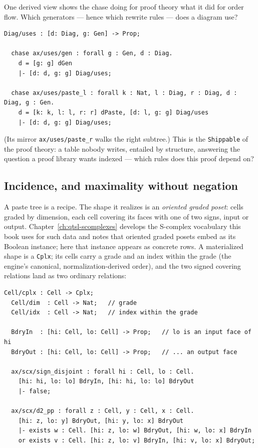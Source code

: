 One derived view shows the chase doing for proof theory what it did
for order flow. Which generators --- hence which rewrite rules ---
does a diagram use?

\begin{Verbatim}[fontsize=\small,frame=leftline,rulecolor=\color{accentmid},framesep=3mm,xleftmargin=3mm]
  Diag/uses : [d: Diag, g: Gen] -> Prop;

  chase ax/uses/gen : forall g : Gen, d : Diag.
    d = [g: g] dGen
    |- [d: d, g: g] Diag/uses;

  chase ax/uses/paste_l : forall k : Nat, l : Diag, r : Diag, d : Diag, g : Gen.
    d = [k: k, l: l, r: r] dPaste, [d: l, g: g] Diag/uses
    |- [d: d, g: g] Diag/uses;
\end{Verbatim}

\noindent (Its mirror \texttt{ax/uses/paste\_r} walks the right
subtree.) This is the \texttt{Shippable} of the proof theory: a table
nobody writes, entailed by structure, answering the question a proof
library wants indexed --- which rules does this proof depend on?

\subsection{Incidence, and maximality without negation}
\label{sec:gt-alifib-tier2}

A paste tree is a recipe. The shape it realizes is an \emph{oriented
graded poset}: cells graded by dimension, each cell covering its faces
with one of two signs, input or output. Chapter~\ref{ch:qtsl-scomplexes}
develops the S-complex vocabulary this book uses for such data and
notes that oriented graded posets embed as its Boolean instance; here
that instance appears as concrete rows. A materialized shape is a
\texttt{Cplx}; its cells carry a grade and an index within the grade
(the engine's canonical, normalization-derived order), and the two
signed covering relations land as two ordinary relations:

\begin{Verbatim}[fontsize=\small,frame=leftline,rulecolor=\color{accentmid},framesep=3mm,xleftmargin=3mm]
  Cell/cplx : Cell -> Cplx;
  Cell/dim  : Cell -> Nat;   // grade
  Cell/idx  : Cell -> Nat;   // index within the grade

  BdryIn  : [hi: Cell, lo: Cell] -> Prop;   // lo is an input face of hi
  BdryOut : [hi: Cell, lo: Cell] -> Prop;   // ... an output face

  ax/scx/sign_disjoint : forall hi : Cell, lo : Cell.
    [hi: hi, lo: lo] BdryIn, [hi: hi, lo: lo] BdryOut
    |- false;

  ax/scx/d2_pp : forall z : Cell, y : Cell, x : Cell.
    [hi: z, lo: y] BdryOut, [hi: y, lo: x] BdryOut
    |- exists w : Cell. [hi: z, lo: w] BdryOut, [hi: w, lo: x] BdryIn
    or exists v : Cell. [hi: z, lo: v] BdryIn, [hi: v, lo: x] BdryOut;
\end{Verbatim}

